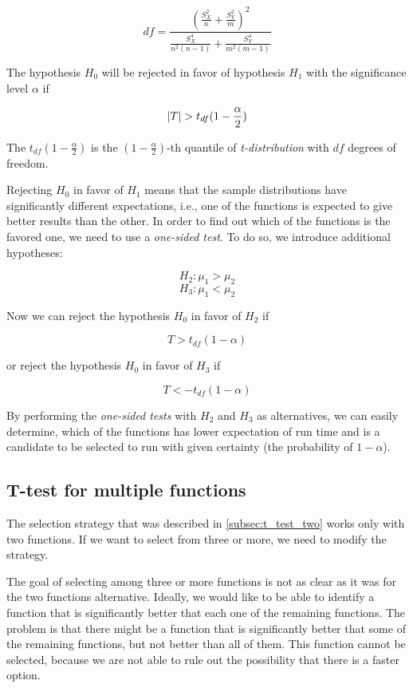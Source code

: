 \[
df = \frac{(\frac{S_X^2}{n} + \frac{S_Y^2}{m})^2}{\frac{S_X^4}{n^2(n - 1)} + \frac{S_Y^4}{m^2(m - 1)}}
\]

The hypothesis $H_0$ will be rejected in favor of hypothesis $H_1$ with the significance level $\alpha$ if

\[\left|{T}\right| > t_{df}(1-\frac{\alpha}{2})\]

The $t_{df}(1-\frac{\alpha}{2})$ is the $(1-\frac{\alpha}{2})$-th quantile of \textit{t-distribution} with $df$ degrees of freedom.

Rejecting $H_0$ in favor of $H_1$ means that the sample distributions have significantly different expectations, i.e., one of the functions is expected to give better results than the other. In order to find out which of the functions is the favored one, we need to use a \textit{one-sided test}. To do so, we introduce additional hypotheses:

\[
H_2: \mu_1 > \mu_2
\]
\[
H_3: \mu_1 < \mu_2
\]

Now we can reject the hypothesis $H_0$ in favor of $H_2$ if

\[T > t_{df}(1-\alpha)\]

or reject the hypothesis $H_0$ in favor of $H_3$ if

\[T < -t_{df}(1-\alpha)\]

By performing the \textit{one-sided tests} with $H_2$ and $H_3$ as alternatives, we can easily determine, which of the functions has lower expectation of run time and is a candidate to be selected to run with given certainty (the probability of $1-\alpha$).

\subsection{T-test for multiple functions}
\label{subsec:t_test_multiple}

The selection strategy that was described in \ref{subsec:t_test_two} works only with two functions. If we want to select from three or more, we need to modify the strategy.

The goal of selecting among three or more functions is not as clear as it was for the two functions alternative. Ideally, we would like to be able to identify a function that is significantly better that each one of the remaining functions. The problem is that there might be a function that is significantly better that some of the remaining functions, but not better than all of them. This function cannot be selected, because we are not able to rule out the 
possibility that there is a faster option.

